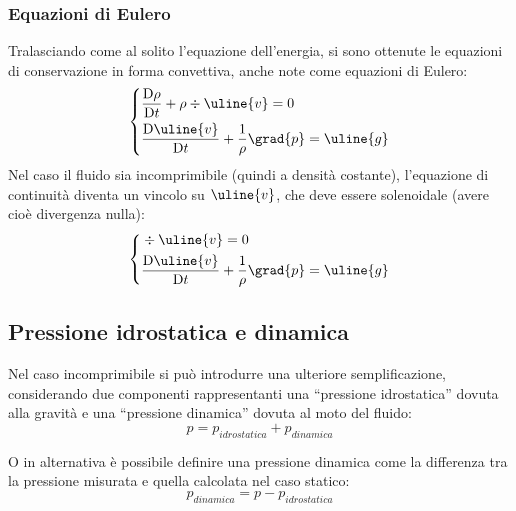 \subsubsection{Equazioni di Eulero}
Tralasciando come al solito l'equazione dell'energia, si sono ottenute le equazioni di conservazione in forma convettiva, anche note come equazioni di Eulero:
%
	\begin{equation*}
		\left\{
			\begin{aligned}
				&\frac{\mathrm{D} \rho}{\mathrm{D} t} + \rho \div{\uline{v}} = 0\\
				&\frac{\mathrm{D} \uline{v}}{\mathrm{D} t} + \frac{1}{\rho} \grad{p} = \uline{g}
			\end{aligned}
		\right.
	\end{equation*}
%
Nel caso il fluido sia incomprimibile (quindi a densità costante), l'equazione di continuità diventa un vincolo su $\uline{v}$, che deve essere solenoidale (avere cioè divergenza nulla):
%
	\begin{equation*}
		\left\{
			\begin{aligned}
				&\div{\uline{v}} = 0\\
				&\frac{\mathrm{D} \uline{v}}{\mathrm{D} t} + \frac{1}{\rho} \grad{p} = \uline{g}
			\end{aligned}
		\right.
	\end{equation*}
%

\subsection{Pressione idrostatica e dinamica}
Nel caso incomprimibile si può introdurre una ulteriore semplificazione, considerando due componenti rappresentanti una ``pressione idrostatica'' dovuta alla gravità e una ``pressione dinamica'' dovuta al moto del fluido:
%
	\begin{equation*}
	 	p = p_{idrostatica} + p_{dinamica}
	\end{equation*}
%

O in alternativa è possibile definire una pressione dinamica come la differenza tra la pressione misurata e quella calcolata nel caso statico:
%
	\begin{equation*}
	 	p_{dinamica} = p - p_{idrostatica}
	\end{equation*}
%

